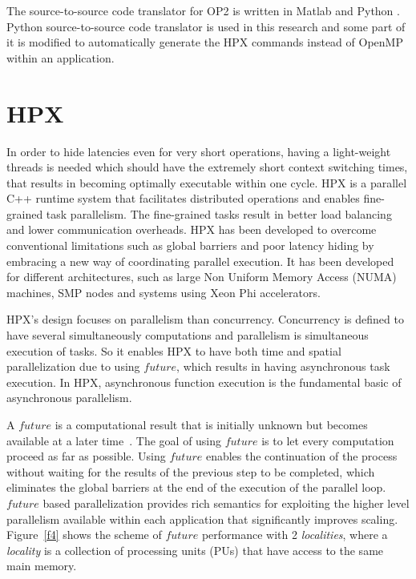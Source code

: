 \documentclass[conference]{IEEEtran}
\begin{document}
The source-to-source code translator for OP2 is written in Matlab and Python \cite{o3}. Python source-to-source code translator is used in this research and some part of it is modified to automatically generate the HPX commands instead of OpenMP within an application. 


\section{HPX}
\label{sec:hpx}

In order to hide latencies even for very short operations, having a light-weight threads is needed which should have the extremely short context switching times, that results in becoming optimally executable within one cycle. HPX is a parallel C++ runtime system that facilitates distributed operations and enables fine-grained task parallelism. The fine-grained tasks result in better load balancing and lower communication overheads. HPX has been developed  to overcome conventional limitations such as global barriers and poor latency hiding \cite{r6} by embracing a new way of coordinating parallel execution. It has been developed for different architectures, such as large Non Uniform Memory Access (NUMA) machines, SMP nodes and systems using Xeon Phi accelerators.


HPX's design focuses on parallelism than concurrency. Concurrency is defined to have several simultaneously computations and parallelism is simultaneous execution of tasks\cite{r15}. So it enables HPX to have both time and spatial parallelization \cite{r19} due to using \textit{$future$}, which results in having asynchronous task execution. In HPX, asynchronous function execution is the fundamental basic of asynchronous parallelism.

A \textit{$future$} is a computational result that is initially unknown but becomes available at a later time~\cite{r20}. The goal of using \textit{$future$} is to let every computation proceed as far as possible. Using \textit{$future$} enables the continuation of the process without waiting for the results of the previous step to be completed, which eliminates the global barriers at the end of the execution of the parallel loop. \textit{$future$} based parallelization provides rich semantics for exploiting the higher level parallelism available within each application that significantly improves scaling. Figure~\ref{f4} shows the scheme of \textit{$future$} performance with 2 \textit{localities}, where a \textit{locality} is a collection of processing units (PUs) that have access to the same main memory. 
\end{document}
